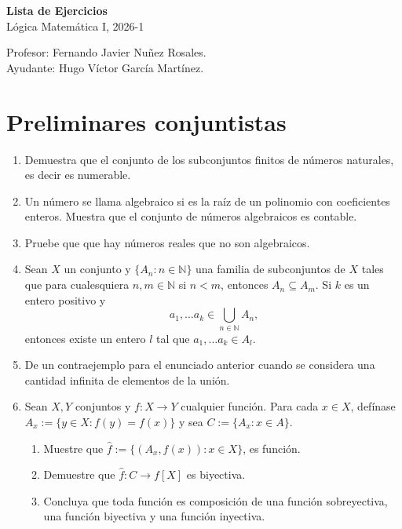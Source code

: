 \documentclass[letterpaper,DIV=15,headsepline,12pt]{scrartcl}
\newcommand{\mathds}[1]{\mathbb{#1}}
\begin{document}
    \thispagestyle{beginstyle}
    \begin{center}
        {\fontsize{30}{60}\rmfamily \textbf{Lista de Ejercicios}} \\ \vspace{.2cm}
        Lógica Matemática I, 2026-1
    \end{center}
    \begin{flushright}
        \footnotesize \hfill Profesor: Fernando Javier Nuñez Rosales.\\
        \hfill Ayudante: Hugo Víctor García Martínez.
    \end{flushright}

    \section*{Preliminares conjuntistas}
    \begin{enumerate}
        \item Demuestra que el conjunto de los subconjuntos finitos de números naturales, es decir es numerable.
        \item Un número se llama algebraico si es la raíz de un polinomio con coeficientes enteros. Muestra que el conjunto de números algebraicos es contable.
        \item Pruebe que que hay números reales que no son algebraicos.
        \item Sean $X$ un conjunto y $\{A_n : n\in\mathds{N} \}$ una familia de subconjuntos de $X$ tales que para cualesquiera $n,m\in\mathds{N}$ si $n<m$, entonces $A_n\subseteq A_m$. Si $k$ es un entero positivo y
        \begin{displaymath}
            a_1,\ldots a_k\in \bigcup_{n\in \mathds{N}}A_n\text{,}
        \end{displaymath}
        entonces existe un entero $l$ tal que $ a_1,\ldots a_k\in A_l$.
        \item De un contraejemplo para el enunciado anterior cuando se considera una cantidad infinita de elementos de la unión.
        \item Sean $X,Y$ conjuntos y $f:X \to Y$ cualquier función. Para cada $x \in X$, defínase $A_x:=\{y \in X : f(y)=f(x)\}$ y sea $C:=\{A_x : x \in A\}$.
        \begin{enumerate}
            \item Muestre que $\hat{f}:=\{(A_x,f(x)) : x \in X\}$, es función.
            \item Demuestre que $\hat{f}:C \to f[X]$ es biyectiva.
            \item Concluya que toda función es composición de una función sobreyectiva, una función biyectiva y una función inyectiva.
        \end{enumerate}
    \end{enumerate}
\end{document}
